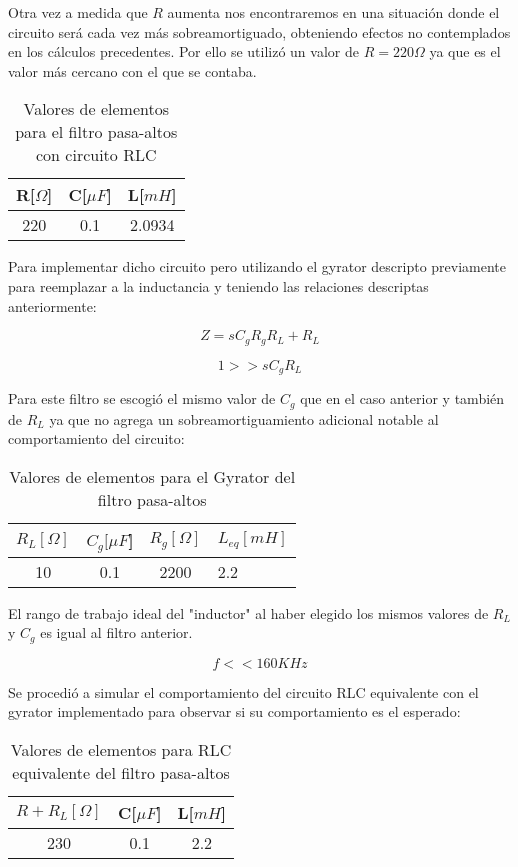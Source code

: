 Otra vez a medida que $R$ aumenta nos encontraremos en una situación donde el circuito será
cada vez más sobreamortiguado, obteniendo efectos no contemplados en los cálculos precedentes. 
Por ello se utilizó un valor de $R= 220 \Omega$ ya que es el valor más cercano con el que se contaba.

\begin{table}[H]
    \centering
    \begin{tabular}{|c|c|c|}
    \hline
    \rowcolor[HTML]{C0C0C0} 
    R[$\Omega$] & C[$\mu F$] & L[$mH$]  \\ \hline
    220     & 0.1  & 2.0934 \\ \hline
    \end{tabular}
    \caption{Valores de elementos para el filtro pasa-altos con circuito RLC}
    \end{table}

Para implementar dicho circuito pero utilizando el gyrator descripto previamente
para reemplazar a la inductancia y teniendo las relaciones descriptas anteriormente:

$$Z=sC_gR_gR_L+R_L$$

$$1 >> sC_gR_L$$

Para este filtro se escogió el mismo valor de $C_g$ que en el caso anterior y también de $R_L$ ya que no agrega un sobreamortiguamiento
adicional notable al comportamiento del circuito:

\begin{table}[H]
    \centering
    \begin{tabular}{|c|c|c|l|}
    \hline
    \rowcolor[HTML]{C0C0C0} 
    $R_L[\Omega]$ & $C_g[\mu F$] & $R_g[\Omega]$  & $L_{eq}[mH]$ \\ \hline
    10      & 0.1  & 2200 & 2.2        \\ \hline
    \end{tabular}
    \caption{Valores de elementos para el Gyrator del filtro pasa-altos}
    \end{table}


El rango de trabajo ideal del "inductor" al haber elegido los mismos valores de $R_L$ y $C_g$ es igual al filtro anterior.

$$f << 160 KHz$$

Se procedió a simular el comportamiento del circuito RLC equivalente con el gyrator implementado para observar si su comportamiento es el esperado:

\begin{table}[H]
    \centering
    \begin{tabular}{|c|c|c|}
    \hline
    \rowcolor[HTML]{C0C0C0} 
    $R+R_L[\Omega]$ & C[$\mu F$] & L[$mH$]  \\ \hline
    230      & 0.1  & 2.2 \\ \hline
    \end{tabular}
    \caption{Valores de elementos para RLC equivalente del filtro pasa-altos}
    \end{table}

